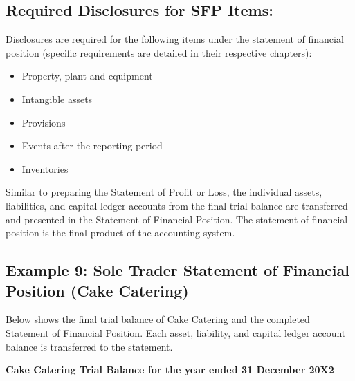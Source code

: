 \subsection*{Required Disclosures for SFP Items:}
Disclosures are required for the following items under the statement of financial position (specific requirements are detailed in their respective chapters):
\begin{itemize}
    \item Property, plant and equipment
    \item Intangible assets
    \item Provisions
    \item Events after the reporting period
    \item Inventories
\end{itemize}

Similar to preparing the Statement of Profit or Loss, the individual assets, liabilities, and capital ledger accounts from the final trial balance are transferred and presented in the Statement of Financial Position. The statement of financial position is the final product of the accounting system.

\subsection*{Example 9: Sole Trader Statement of Financial Position (Cake Catering)}
Below shows the final trial balance of Cake Catering and the completed Statement of Financial Position. Each asset, liability, and capital ledger account balance is transferred to the statement.

\textbf{Cake Catering Trial Balance for the year ended 31 December 20X2}

